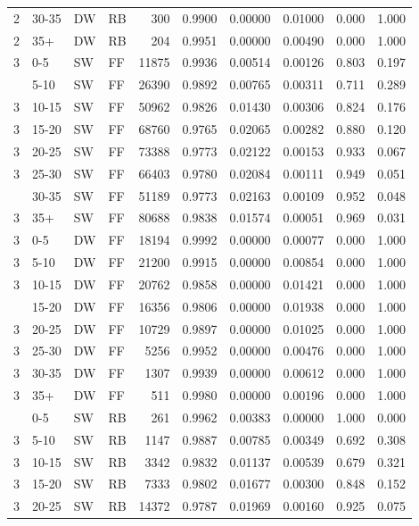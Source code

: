 \documentclass[
  11pt,
]{article}
\begin{document}
\begin{longtable}{llllrrrrrr}
2 & 30-35 & DW & RB & 300 & 0.9900 & 0.00000 & 0.01000 & 0.000 & 1.000\\
2 & 35+ & DW & RB & 204 & 0.9951 & 0.00000 & 0.00490 & 0.000 & 1.000\\
3 & 0-5 & SW & FF & 11875 & 0.9936 & 0.00514 & 0.00126 & 0.803 & 0.197\\
\addlinespace
3 & 5-10 & SW & FF & 26390 & 0.9892 & 0.00765 & 0.00311 & 0.711 & 0.289\\
3 & 10-15 & SW & FF & 50962 & 0.9826 & 0.01430 & 0.00306 & 0.824 & 0.176\\
3 & 15-20 & SW & FF & 68760 & 0.9765 & 0.02065 & 0.00282 & 0.880 & 0.120\\
3 & 20-25 & SW & FF & 73388 & 0.9773 & 0.02122 & 0.00153 & 0.933 & 0.067\\
3 & 25-30 & SW & FF & 66403 & 0.9780 & 0.02084 & 0.00111 & 0.949 & 0.051\\
\addlinespace
3 & 30-35 & SW & FF & 51189 & 0.9773 & 0.02163 & 0.00109 & 0.952 & 0.048\\
3 & 35+ & SW & FF & 80688 & 0.9838 & 0.01574 & 0.00051 & 0.969 & 0.031\\
3 & 0-5 & DW & FF & 18194 & 0.9992 & 0.00000 & 0.00077 & 0.000 & 1.000\\
3 & 5-10 & DW & FF & 21200 & 0.9915 & 0.00000 & 0.00854 & 0.000 & 1.000\\
3 & 10-15 & DW & FF & 20762 & 0.9858 & 0.00000 & 0.01421 & 0.000 & 1.000\\
\addlinespace
3 & 15-20 & DW & FF & 16356 & 0.9806 & 0.00000 & 0.01938 & 0.000 & 1.000\\
3 & 20-25 & DW & FF & 10729 & 0.9897 & 0.00000 & 0.01025 & 0.000 & 1.000\\
3 & 25-30 & DW & FF & 5256 & 0.9952 & 0.00000 & 0.00476 & 0.000 & 1.000\\
3 & 30-35 & DW & FF & 1307 & 0.9939 & 0.00000 & 0.00612 & 0.000 & 1.000\\
3 & 35+ & DW & FF & 511 & 0.9980 & 0.00000 & 0.00196 & 0.000 & 1.000\\
\addlinespace
3 & 0-5 & SW & RB & 261 & 0.9962 & 0.00383 & 0.00000 & 1.000 & 0.000\\
3 & 5-10 & SW & RB & 1147 & 0.9887 & 0.00785 & 0.00349 & 0.692 & 0.308\\
3 & 10-15 & SW & RB & 3342 & 0.9832 & 0.01137 & 0.00539 & 0.679 & 0.321\\
3 & 15-20 & SW & RB & 7333 & 0.9802 & 0.01677 & 0.00300 & 0.848 & 0.152\\
3 & 20-25 & SW & RB & 14372 & 0.9787 & 0.01969 & 0.00160 & 0.925 & 0.075\\

\end{longtable}
\end{document}
